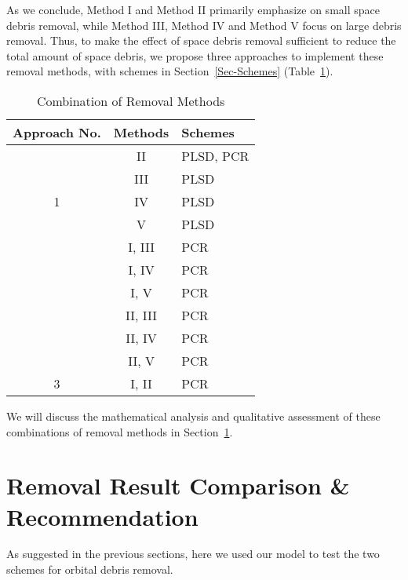 \documentclass{mcmthesis}
\begin{document}
	As we conclude, Method I and Method II primarily emphasize on small space debris removal, while Method III, Method IV and Method V focus on large debris removal. Thus, to make the effect of space debris removal sufficient to reduce the total amount of space debris, we propose three approaches to implement these removal methods, with schemes in Section~\ref{Sec-Schemes} (Table~\ref{Tab-Combination}).
	
		\begin{table}[htbp]
			\centering
			\caption{Combination of Removal Methods}
			\begin{tabular}{c|cl}
				\hline
				\hline
				Approach No. & Methods & Schemes \\
				\hline
				\multirow{5}{*}{1} & II & PLSD, PCR\\
				 & III & PLSD\\
				 & IV & PLSD\\
				 & V & PLSD\\
				 \hline
				 \multirow{6}{*}{2} & I, III & PCR\\
				 &I, IV&PCR\\
				 &I, V&PCR\\
				 &II, III&PCR\\
				 &II, IV&PCR\\
				&II, V&PCR\\
				\hline
				3& I, II& PCR\\
				\hline
			\end{tabular}
			\label{Tab-Combination}
		\end{table}
	
	We will discuss the mathematical analysis and qualitative assessment of these combinations of removal methods in Section~\ref{Sec-Comparison}.
	
	\section{Removal Result Comparison \& Recommendation} \label{Sec-Comparison}
	
	As suggested in the previous sections, here we used our model to test the two schemes for orbital debris removal.
	
\end{document}

